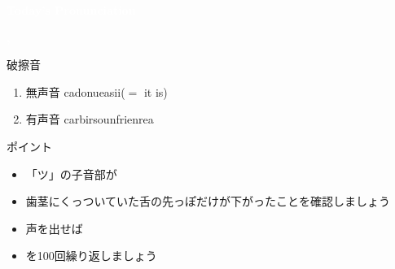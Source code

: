 \documentclass[aspectratio=169,xcolor={dvipsnames,table}]{beamer}
\begin{document}
\begin{frame}
\centering
  \textcolor{white}{\Huge\bfseries Today's Pronunciation}\pause

 \vspace{30pt}

  \textcolor{white}{\Huge\bfseries {}, }


\end{frame}
 \begin{frame}[plain]{破擦音}

\large

\begin{enumerate}
 \item  無声音 \hspace{20pt}ca\hspace{1\zw}donu\hspace{1\zw}ea\hspace{1\zw}si\hspace{1\zw}i($=$ it is)
 \item  有声音 \hspace{20pt}car\hspace{1\zw}bir\hspace{1\zw}soun\hspace{1\zw}frien\hspace{1\zw}rea
\end{enumerate}

\vspace*{20pt}

\normalsize
ポイント

\begin{itemize}
 \item 「ツ」の子音部が
 \item 歯茎にくっついていた舌の先っぽだけが下がったことを確認しましょう
 \item 声を出せば
 \item {}を100回繰り返しましょう
\end{itemize}
\hfill{}

\hypertarget{tips}{}
\hyperlink{ex}{}

\end{frame}
\end{document}
